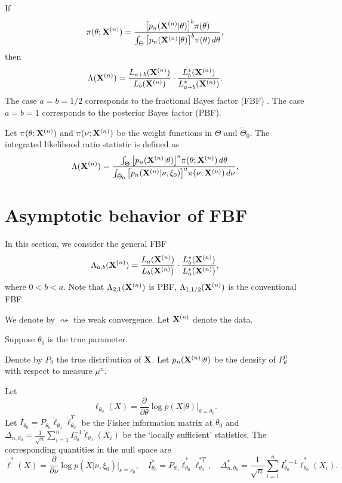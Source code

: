 \documentclass[3p]{elsarticle}
\theoremstyle{plain}
\theoremstyle{definition}
\theoremstyle{remark}
\begin{document}
If
$$
\pi(\theta;\mathbf{X}^{(n)})=\frac{\big[p_n(\mathbf{X}^{(n)}|\theta)\big]^b \pi(\theta)}{\int_{\Theta}\big[p_n(\mathbf{X}^{(n)}|\theta)\big]^b \pi(\theta)\, d\theta},
$$
then
$$
\Lambda(\mathbf{X}^{(n)})= \frac{L_{a+b}(\mathbf{X}^{(n)})}{L_{b}(\mathbf{X}^{(n)})}\cdot \frac{L_{b}^*(\mathbf{X}^{(n)})}{L_{a+b}^*(\mathbf{X}^{(n)})}.
$$
The case $a=b=1/2$ corresponds to the fractional Bayes factor (FBF) \citep{Fractional1995}.
The case $a=b=1$ corresponds to the posterior Bayes factor (PBF).


Let $\pi(\theta;\mathbf{X}^{(n)})$ and $\pi(\nu;\mathbf{X}^{(n)})$ be the weight functions in $\Theta$ and $\tilde{\Theta}_0$.
The integrated likelihood ratio statistic is defined as
\begin{equation}
    \Lambda (\mathbf{X}^{(n)})=\frac{\int_{\Theta} \big[p_n(\mathbf{X}^{(n)}|\theta)\big]^{a}\pi(\theta;\mathbf{X}^{(n)})\,d\theta}{\int_{\tilde{\Theta}_0} \big[p_n(\mathbf{X}^{(n)}|\nu,\xi_0)\big]^{a}\pi(\nu;\mathbf{X}^{(n)})\,d\nu},
\end{equation}



\section{Asymptotic behavior of FBF}
In this section, we consider the general FBF
\begin{equation*}
    \Lambda_{a,b}(\mathbf{X}^{(n)})=
    \frac{L_{a}(\mathbf{X}^{(n)})}{L_{b}(\mathbf{X}^{(n)})}\cdot \frac{L_{b}^*(\mathbf{X}^{(n)})}{L_{a}^*(\mathbf{X}^{(n)})},
\end{equation*}
where $0<b<a$.
Note that $\Lambda_{2,1}(\mathbf{X}^{(n)})$ is PBF, $\Lambda_{1,1/2}(\mathbf{X}^{(n)})$ is the conventional FBF.



We denote by $\rightsquigarrow$ the weak convergence. 
Let $\mathbf{X}^{(n)}$ denote the data.

Suppose $\theta_0$ is the true parameter.

Denote by $P_0$ the true distribution of $\mathbf{X}$.
Let $p_{n}(\mathbf{X}^{(n)}|\theta)$ be the density of  $P_{\theta}^{n}$ with respect to measure $\mu^n$.


Let 
$$\dot{\ell}_{\theta_0}(X)=\frac{\partial}{\partial \theta}\log p(X|\theta)\Big|_{\theta=\theta_0}.$$
Let $I_{\theta_0}=P_{\theta_0}\dot{\ell}_{\theta_0}\dot{\ell}_{\theta_0}^T$ be the Fisher information matrix at $\theta_0$ and $\Delta_{n,\theta_0}=\frac{1}{\sqrt{n}}\sum_{i=1}^n I_{\theta_0}^{-1}\dot{\ell}_{\theta_0}(X_i)$ be the `locally sufficient' statistics.
The corresponding quantities in the null space are 
$$\dot{\ell}^*(X)=\frac{\partial}{\partial \nu}\log p(X|\nu,\xi_0)\Big|_{\nu=\nu_0}, \quad I^*_{\theta_0}=P_{\theta_0}\dot{\ell}_{\theta_0}^*\dot{\ell}_{\theta_0}^{*T},\quad \Delta_{n,\theta_0}^*
=\frac{1}{\sqrt{n}}\sum_{i=1}^n I_{\theta_0}^{*-1}\dot{\ell}^{*}_{\theta_0}(X_i).
$$
\end{document}
